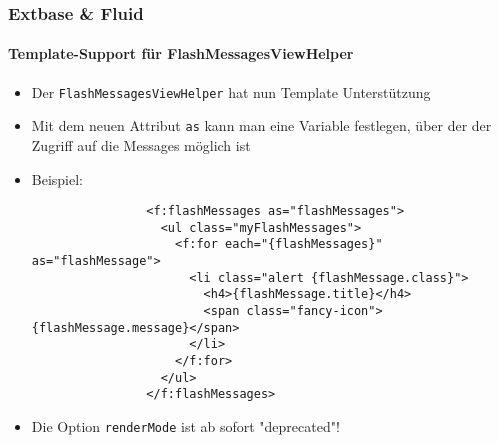 \begin{frame}[fragile]
	\frametitle{Extbase \& Fluid}
	\framesubtitle{Template-Support für FlashMessagesViewHelper}

	\lstset{basicstyle=\tiny\ttfamily}

	\begin{itemize}

		\item Der \texttt{FlashMessagesViewHelper} hat nun Template Unterstützung

		\item Mit dem neuen Attribut \texttt{as} kann man eine Variable festlegen,
			über der der Zugriff auf die Messages möglich ist

		\item Beispiel:

			\begin{lstlisting}
				<f:flashMessages as="flashMessages">
				  <ul class="myFlashMessages">
				    <f:for each="{flashMessages}" as="flashMessage">
				      <li class="alert {flashMessage.class}">
				        <h4>{flashMessage.title}</h4>
				        <span class="fancy-icon">{flashMessage.message}</span>
				      </li>
				    </f:for>
				  </ul>
				</f:flashMessages>
			\end{lstlisting}

		\item Die Option \texttt{renderMode} ist ab sofort "deprecated"!

	\end{itemize}

\end{frame}


